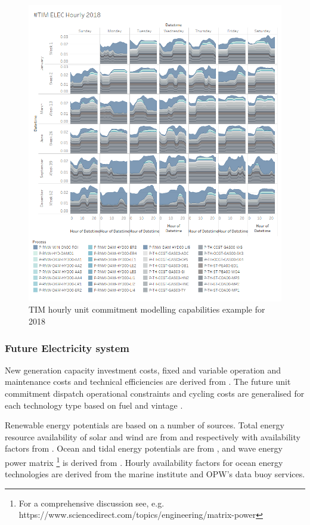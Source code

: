 \documentclass[gmd,manuscript]{copernicus}
\begin{document}
\begin{figure}[!htbp]
 \centering
 \includegraphics[scale=0.6]{figures/TIM_Elec_Hourly.png} 
 \caption{TIM hourly unit commitment modelling capabilities example for 2018}
 \label{fig:TIM_HourlyELC}
\end{figure}

\subsubsection{Future Electricity system}
New generation capacity investment costs, fixed and variable operation and maintenance costs and technical efficiencies are derived from \citet{Carlsson2014}. The future unit commitment dispatch operational constraints and cycling costs are generalised for each technology type based on fuel and vintage \citep{Kumar2012}. 

Renewable energy potentials are based on a number of sources. Total energy resource availability of solar and wind are from \citet{Pfenninger2016} and \citet{Staffell2016} respectively with availability factors from \citet{Ruiz2019}. Ocean and tidal energy potentials are from \citet{ORourke2010}, and wave energy power matrix \footnote{For a comprehensive discussion see, e.g. https://www.sciencedirect.com/topics/engineering/matrix-power} is derived from \citet{Nambiar2016}. Hourly availability factors for ocean energy technologies are derived from the marine institute and OPW's data buoy services.
\end{document}
